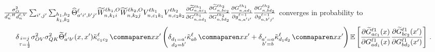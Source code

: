 \begin{lemma}\label{lem:vv_ntk}
    $
        \frac{\sigma_{O}^2}{d_{n}^{\ell, H} d_{n}^{\ell, V}}
        \sum_{i', j'}
        \sum_{\substack{h_1, h_2\\ k_1, k_2}}
            \widehat{\Theta}_{
                a' i' , b' j'
            }^{\ell}
            \widetilde{W}_{n , k_1 i}^{\ell h_1 , O}
            \widetilde{W}_{n , k_2 j}^{\ell h_2 , O}
            V_{n, c_1 k_1}^{\ell h_1}
            V_{n, c_2 k_2}^{\ell h_2}
            \frac{
                \partial
                \widetilde{G}_{n, a c_1}^{\ell h_1}
            }{
                \partial 
                G_{n, a d_1}^{\ell h_1}
            }
            \frac{
                \partial
                \widetilde{G}_{n, b c_2}^{\ell h_2}
            }{
                \partial 
                G_{n, b d_2}^{\ell h_2}
            }
            \frac{
                \partial 
                G_{n, a d_1}^{\ell h_1}
            }{
                \partial g_{n, a' i'}^{\ell - 1}
            }
            \frac{
                \partial 
                G_{n, b d_2}^{\ell h_2}
            }{
                \partial g_{n, b' j'}^{\ell - 1}
            }
    $
    converges in probability to
    \begin{align*}
        \delta_{\substack{i = j \\ \scaling = \frac{1}{2}}}
        \OVVar
        \QKVar
        \ntktilde_{\gIndexA \gIndexB}^{\depthSymbol}(\inputSymbol, \inputSymbol')
        \kerntildef{c_1 c_2}{\depthSymbol}{\inputSymbol}{\inputSymbol'}
        \left( 
            \delta_{\substack{d_1 = \gIndexA \\ d_2 = \gIndexB}}
            \kerntildef{\fIndexA \fIndexB}{\depthSymbol}{\inputSymbol}{\inputSymbol'}
            +
            \delta_{\substack{\gIndexA = \fIndexA \\ \gIndexB = \fIndexB}}
            \kerntildef{d_1 d_2}{\depthSymbol}{\inputSymbol}{\inputSymbol'}
        \right)
        \E \left[
            \frac{
                \partial
                \tildeLogit{\fIndexA c_1}{\depthSymbol 1} (\inputSymbol)
            }{
                \partial 
                \logitSymbol_{\fIndexA d_1}^{\depthSymbol 1} (\inputSymbol)
            }
            \frac{
                \partial
                \tildeLogit{\fIndexB c_2}{\depthSymbol 1} (\inputSymbol')
            }{
                \partial 
                \logitSymbol_{\fIndexB d_2}^{\depthSymbol 1} (\inputSymbol')
            }
        \right]
        \, .
    \end{align*}
\end{lemma}



